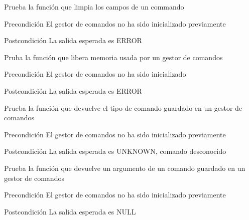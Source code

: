 \begin{DoxyRefList}
\item[\label{test__test000020}%
\hypertarget{test__test000020}{}%
Global \hyperlink{command__test_8c_a7085470610e5bf017e80ad91066a3f38}{test2\-\_\-command\-\_\-clear} ()]Prueba la función que limpia los campos de un commando \begin{DoxyPrecond}{Precondición}
El gestor de comandos no ha sido inicializado previamente 
\end{DoxyPrecond}
\begin{DoxyPostcond}{Postcondición}
La salida esperada es E\-R\-R\-O\-R  
\end{DoxyPostcond}

\item[\label{test__test000005}%
\hypertarget{test__test000005}{}%
Global \hyperlink{command__test_8c_ad445f3e81035d4ab32ebc1526eb83fcb}{test2\-\_\-command\-\_\-destroy} ()]Pruba la función que libera memoria usada por un gestor de comandos \begin{DoxyPrecond}{Precondición}
El gestor de comandos no ha sido inicializado 
\end{DoxyPrecond}
\begin{DoxyPostcond}{Postcondición}
La salida esperada es E\-R\-R\-O\-R  
\end{DoxyPostcond}

\item[\label{test__test000014}%
\hypertarget{test__test000014}{}%
Global \hyperlink{command__test_8c_ae7f9f291a48473456084f864aaf1e1de}{test2\-\_\-command\-\_\-get\-\_\-cmd} ()]Prueba la función que devuelve el tipo de comando guardado en un gestor de comandos \begin{DoxyPrecond}{Precondición}
El gestor de comandos no ha sido inicializado previamente 
\end{DoxyPrecond}
\begin{DoxyPostcond}{Postcondición}
La salida esperada es U\-N\-K\-N\-O\-W\-N, comando desconocido  
\end{DoxyPostcond}

\item[\label{test__test000017}%
\hypertarget{test__test000017}{}%
Global \hyperlink{command__test_8c_a5b62a191da5df0efe3c990570886943c}{test2\-\_\-command\-\_\-get\-\_\-cmd\-\_\-arg} ()]Prueba la función que devuelve un argumento de un comando guardado en un gestor de comandos \begin{DoxyPrecond}{Precondición}
El gestor de comandos no ha sido inicializado previamente 
\end{DoxyPrecond}
\begin{DoxyPostcond}{Postcondición}
La salida esperada es N\-U\-L\-L  
\end{DoxyPostcond}


\end{DoxyRefList}
